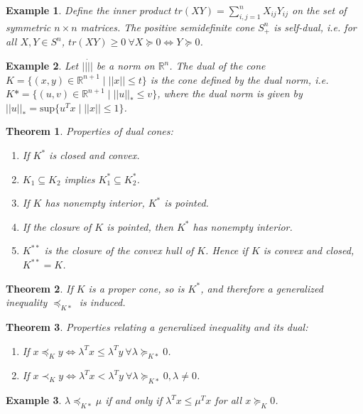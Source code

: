 \documentclass[a4paper]{article}
\newtheorem{mytheorem}{Theorem}
\newtheorem{example}{Example}
\numberwithin{mytheorem}{section}
\numberwithin{mydef}{section}
\numberwithin{example}{section}
\begin{document}
\begin{example} Define the inner product $tr(XY) = \sum^{n}_{i,j = 1}X_{ij}Y_{ij}$ on the set of symmetric $n \times n$ matrices. The positive semidefinite cone $S^{n}_{+}$ is self-dual, i.e. for all $X,Y \in S^{n}$, $tr(XY) \geq 0 \ \forall X \succeq 0 \iff Y \succeq 0$.  
\end{example}

\begin{example} Let $||\dot||$ be a norm on $\mathbb{R}^{n}$. The dual of the cone $K = \{ (x,y) \in \mathbb{R}^{n+1} \mid ||x|| \leq t \}$ is the cone defined by the dual norm, i.e. $K* = \{ (u,v) \in \mathbb{R}^{n+1} \mid ||u||_{*} \leq v \}$, where the dual norm is given by $||u||_{*} = \text{sup}\{ u^{T}x \mid ||x|| \leq 1 \}$. 
\end{example}

\begin{mytheorem} Properties of dual cones:
\begin{enumerate}
\item If $K^{*}$ is closed and convex.
\item $K_{1} \subseteq K_{2}$ implies $K^{*}_{1} \subseteq K^{*}_{2}$. 
\item If $K$ has nonempty interior, $K^{*}$ is pointed.
\item If the closure of $K$ is pointed, then $K^{*}$ has nonempty interior.
\item $K^{**}$ is the closure of the convex hull of $K$. Hence if $K$ is convex and closed, $K^{**} = K$.
\end{enumerate}
\end{mytheorem}

\begin{mytheorem} If $K$ is a proper cone, so is $K^{*}$, and therefore a generalized inequality $\preceq_{K*}$ is induced. \end{mytheorem}

\begin{mytheorem} Properties relating a generalized inequality and its dual:
\begin{enumerate}
\item If $x \preceq_{K} y \iff \lambda^{T}x \leq \lambda^{T}y \ \forall \lambda \succeq_{K*} 0$.
\item If $x \prec_{K} y \iff \lambda^{T}x < \lambda^{T}y \ \forall \lambda \succeq_{K*} 0, \lambda \neq 0$.
\end{enumerate}
\end{mytheorem}

\begin{example} $\lambda \preceq_{K*} \mu$ if and only if $\lambda^{T}x \leq \mu^{T}x$ for all $x \succeq_{K} 0$.
\end{example}
\end{document}
